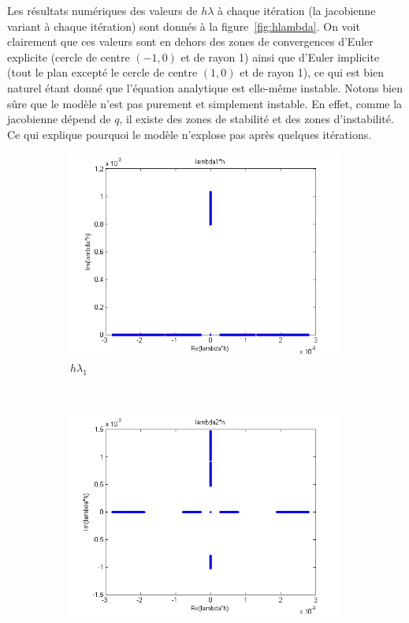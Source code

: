 Les résultats numériques des valeurs de $h \lambda$ à chaque itération (la jacobienne variant à chaque itération)
sont donnés à la figure~\ref{fig:hlambda}.
On voit clairement que ces valeurs sont en dehors des zones de convergences d'Euler explicite
(cercle de centre $(-1,0)$ et de rayon 1) ainsi que d'Euler implicite
(tout le plan excepté le cercle de centre $(1,0)$ et de rayon 1),
ce qui est bien naturel étant donné que l'équation analytique est elle-même instable.
Notons bien sûre que le modèle n'est pas purement et simplement instable.
En effet, comme la jacobienne dépend de $q$, il existe des zones de stabilité et des zones d'instabilité.
Ce qui explique pourquoi le modèle n'explose pas après quelques itérations.

\begin{figure}
  \centering
  \begin{subfigure}[b]{0.5\textwidth}
    \includegraphics[width=\textwidth]{images/Q1_hlambda1.png}
    \caption{$h \lambda_1$}
  \end{subfigure}%
  ~ %
  \begin{subfigure}[b]{0.5\textwidth}
    \includegraphics[width=\textwidth]{images/Q1_hlambda2.png}

\end{subfigure}
\end{figure}
